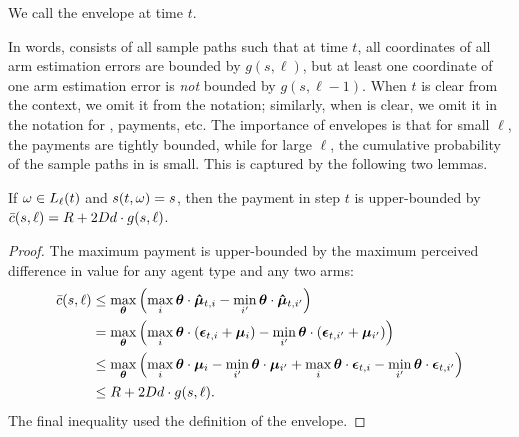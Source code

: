 We call \Env[t]{\ell} the \Kth{\ell} envelope at time $t$.


In words, \Env[t]{\ell} consists of all sample paths such that at time
$t$, all coordinates of all arm estimation errors are bounded by
$g(s, \ell)$, but at least one coordinate of one arm estimation error
is \emph{not} bounded by $g(s, \ell-1)$.
When $t$ is clear from the context, we omit it from the notation;
similarly, when \SP is clear, we omit it in the notation for
, payments, etc.
The importance of envelopes is that for small $\ell$, the payments are
tightly bounded, while for large $\ell$, the cumulative probability of
the sample paths in \Env[t]{\ell} is small.
This is captured by the following two lemmas.

\begin{lemma} \label{lem:sample-path-payment}
If $\SP \in \Env[t]{\ell}$ and $s(t,\omega) = s$, then
the payment in step $t$ is upper-bounded by
$\bar{c} (s,\ell) = R + 2 D d \cdot g(s,\ell)$.
\end{lemma}

\begin{proof}
The maximum payment is upper-bounded by the maximum perceived
difference in value for any agent type and any two arms:
\begin{align*}
\bar{c} (s, \ell) & \leq 
\max_{\bm{\theta}} \left(  \max_{i} \bm{\theta} \cdot \bm{\hat{\mu}}_{t,i}
                 - \min_{i'} \bm{\theta} \cdot \bm{\hat{\mu}}_{t,i'} \right) \\
& = \max_{\bm{\theta}} \left( \max_{i}\bm{\theta} \cdot (\bm{\epsilon}_{t,i}+\bm{\mu}_{i})
                    - \min_{i'}\bm{\theta} \cdot (\bm{\epsilon}_{t,i'}+\bm{\mu}_{i'}) \right) \\
& \leq \max_{\bm{\theta}} \left(  \max_{i} \bm{\theta} \cdot \bm{\mu}_{i}
                        - \min_{i'} \bm{\theta} \cdot \bm{\mu}_{i'}
                        + \max_{i} \bm{\theta} \cdot \bm{\epsilon}_{t,i}
                        - \min_{i'} \bm{\theta} \cdot \bm{\epsilon}_{t,i'} \right) \\
& \leq R + 2 D d \cdot g(s,\ell). 
\end{align*}
The final inequality used the definition of the envelope.
\end{proof}

